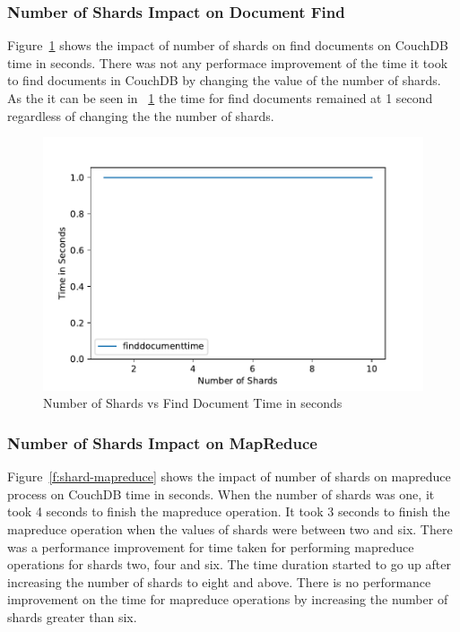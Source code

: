 \subsubsection{Number of Shards Impact on Document Find}


Figure~\ref{f:shard-find} shows the impact of number of shards on find
documents on CouchDB time in seconds. There was not any performace
improvement of the time it took to find documents in CouchDB  by
changing the value of the number of shards. As the it can be seen in
~\ref{f:shard-find} the time for find documents remained at 1 second
regardless of changing the the number of shards.

\begin{figure}[!ht]
  \centering\includegraphics[width=\columnwidth]{../images/ShardsFindDoc.pdf}
  \caption{Number of Shards vs Find Document Time in seconds }\label{f:shard-find}
\end{figure}

\subsubsection{Number of Shards Impact on MapReduce}


Figure~\ref{f:shard-mapreduce} shows the impact of number of shards on
mapreduce process on CouchDB time in seconds. When the number of shards was one, it took 4 seconds to finish
the mapreduce operation. It took 3 seconds to finish
the mapreduce operation when the values of shards were between two and
six. There was a performance
improvement for time taken for performing mapreduce operations for shards two, four and six.  The time duration started to
go up after increasing the number of shards to eight and above. There
is no performance improvement on the time for mapreduce operations by
increasing the number of shards greater than six.

